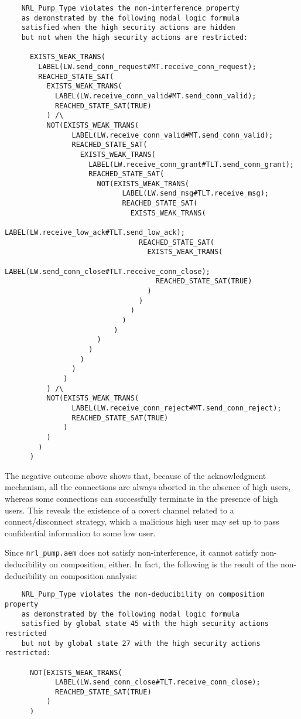 	\begin{verbatim}
    NRL_Pump_Type violates the non-interference property
    as demonstrated by the following modal logic formula
    satisfied when the high security actions are hidden
    but not when the high security actions are restricted:

      EXISTS_WEAK_TRANS(
        LABEL(LW.send_conn_request#MT.receive_conn_request); 
        REACHED_STATE_SAT(
          EXISTS_WEAK_TRANS(
            LABEL(LW.receive_conn_valid#MT.send_conn_valid); 
            REACHED_STATE_SAT(TRUE)
          ) /\
          NOT(EXISTS_WEAK_TRANS(
                LABEL(LW.receive_conn_valid#MT.send_conn_valid); 
                REACHED_STATE_SAT(
                  EXISTS_WEAK_TRANS(
                    LABEL(LW.receive_conn_grant#TLT.send_conn_grant); 
                    REACHED_STATE_SAT(
                      NOT(EXISTS_WEAK_TRANS(
                            LABEL(LW.send_msg#TLT.receive_msg); 
                            REACHED_STATE_SAT(
                              EXISTS_WEAK_TRANS(
                                LABEL(LW.receive_low_ack#TLT.send_low_ack); 
                                REACHED_STATE_SAT(
                                  EXISTS_WEAK_TRANS(
                                    LABEL(LW.send_conn_close#TLT.receive_conn_close); 
                                    REACHED_STATE_SAT(TRUE)
                                  )
                                )
                              )
                            )
                          )
                      )
                    )
                  )
                )
              )
          ) /\
          NOT(EXISTS_WEAK_TRANS(
                LABEL(LW.receive_conn_reject#MT.send_conn_reject); 
                REACHED_STATE_SAT(TRUE)
              )
          )
        )
      )
	\end{verbatim}

\noindent The negative outcome above shows that, because of the acknowledgment mechanism, all the
connections are always aborted in the absence of high users, whereas some connections can successfully
terminate in the presence of high users. This reveals the existence of a covert channel related to a
connect/disconnect strategy, which a malicious high user may set up to pass confidential information to some
low user.

Since {\tt nrl\_pump.aem} does not satisfy non-interference, it cannot satisfy non-deducibility on
composition, either. In fact, the following is the result of the non-deducibility on composition analysis:

\newpage

	\begin{verbatim}
    NRL_Pump_Type violates the non-deducibility on composition property
    as demonstrated by the following modal logic formula
    satisfied by global state 45 with the high security actions restricted
    but not by global state 27 with the high security actions restricted:
	
      NOT(EXISTS_WEAK_TRANS(
            LABEL(LW.send_conn_close#TLT.receive_conn_close); 
            REACHED_STATE_SAT(TRUE)
          )
      )
	\end{verbatim}

